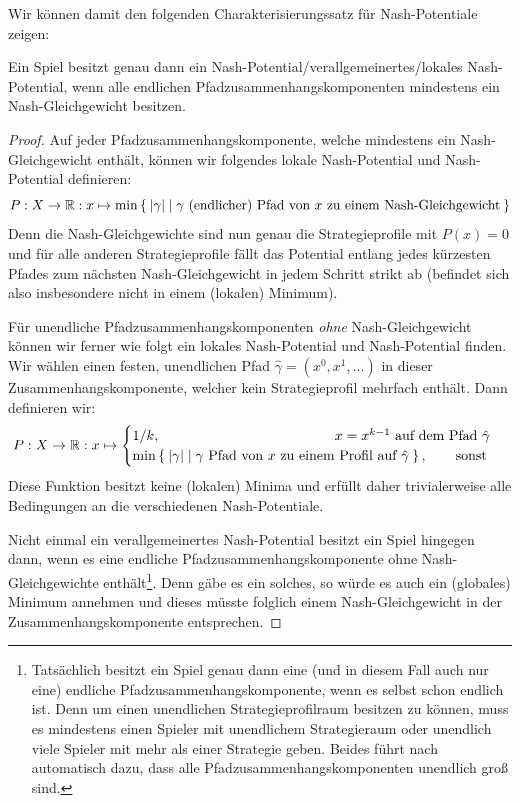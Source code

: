 Wir können damit den folgenden Charakterisierungssatz für Nash-Potentiale zeigen:

\begin{satz}\label{satz:CharExNashPot}
	Ein Spiel besitzt genau dann ein Nash-Potential/verallgemeinertes/lokales Nash-Potential, wenn alle endlichen Pfadzusammenhangskomponenten mindestens ein Nash-Gleichgewicht besitzen.
\end{satz}

\begin{proof}
	Auf jeder Pfadzusammenhangskomponente, welche mindestens ein Nash-Gleichgewicht enthält, können wir folgendes lokale Nash-Potential und Nash-Potential definieren:
	\[P: X \to \mathbb{R}: x \mapsto \min\Set{\left|\gamma\right| | \gamma \text{ (endlicher) Pfad von } x \text{ zu einem Nash-Gleichgewicht}} \]
	Denn die Nash-Gleichgewichte sind nun genau die Strategieprofile mit $P(x) = 0$ und für alle anderen Strategieprofile fällt das Potential entlang jedes kürzesten Pfades zum nächsten Nash-Gleichgewicht in jedem Schritt strikt ab (befindet sich also insbesondere nicht in einem (lokalen) Minimum).
	
	Für unendliche Pfadzusammenhangskomponenten \emph{ohne} Nash-Gleichgewicht können wir ferner wie folgt ein lokales Nash-Potential und Nash-Potential finden. Wir wählen einen festen, unendlichen Pfad $\hat{\gamma} = (x^0, x^1, \dots)$ in dieser Zusammenhangskomponente, welcher kein Strategieprofil mehrfach enthält. Dann definieren wir:
	\[P: X \to \IR: x \mapsto \begin{cases}
	1/k, \hspace{12.5em} x = x^{k-1} \text{ auf dem Pfad } \hat{\gamma} \\
	\min\Set{\abs{\gamma} | \gamma \text{ Pfad von $x$ zu einem Profil auf $\hat{\gamma}$}}, \qquad\text{sonst}
	\end{cases}\]
	Diese Funktion besitzt keine (lokalen) Minima und erfüllt daher trivialerweise alle Bedingungen an die verschiedenen Nash-Potentiale.
	
	Nicht einmal ein verallgemeinertes Nash-Potential besitzt ein Spiel hingegen dann, wenn es eine endliche Pfadzusammenhangskomponente ohne Nash-Gleichgewichte enthält\footnote{Tatsächlich besitzt ein Spiel genau dann eine (und in diesem Fall auch nur eine) endliche Pfadzusammenhangskomponente, wenn es selbst schon endlich ist. Denn um einen unendlichen Strategieprofilraum besitzen zu können, muss es mindestens einen Spieler mit unendlichem Strategieraum oder unendlich viele Spieler mit mehr als einer Strategie geben. Beides führt nach  automatisch dazu, dass alle Pfadzusammenhangskomponenten unendlich groß sind.}. Denn gäbe es ein solches, so würde es auch ein (globales) Minimum annehmen und dieses müsste folglich einem Nash-Gleichgewicht in der Zusammenhangskomponente entsprechen.
\end{proof}

